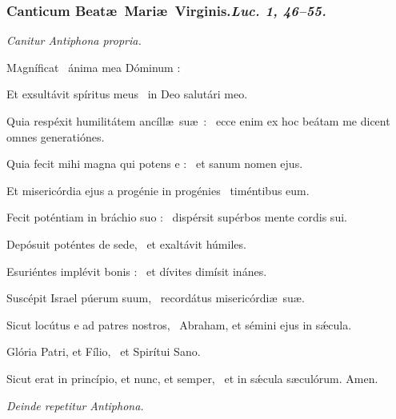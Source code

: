 \documentclass[12pt]{article} %
\newenvironment{psalmtext}{\leftskip 0.25in}{\vspace{2 mm}}
\newenvironment{rubric}{\vspace{2 mm}\color{benred8} \itshape \leftskip 0in \setlength{\parindent}{0.25in}}{\vspace{2 mm}}
\let\oldgresixstar\gresixstar
\renewcommand{\gresixstar}{\textcolor{benred8}{\oldgresixstar}}
\let\oldgrealtcross\grealtcross
\renewcommand{\grealtcross}{\textcolor{benred8}{\oldgrealtcross}}
\def\capitulumSpace{\hspace{20 mm}}
\begin{document}
\begin{pages}
\begin{Leftside}
\subsubsection*{Canticum Beat\ae\ Mari\ae\ Virginis.\capitulumSpace \emph{Luc. 1, 46--55.}}

\pend\pstart

\begin{rubric}
Canitur Antiphona propria.

\end{rubric}

\pend\pstart

\begin{psalmtext}
\lettrine[lhang=0.70]{M}{a}gn\'{i}ficat \grealtcross\ \'{a}nima mea D\'{o}minum :

\hspace*{9.5 mm}Et exsult\'{a}vit sp\'{i}ritus meus \gresixstar\ in Deo salut\'{a}ri meo.

Quia resp\'{e}xit humilit\'{a}tem anc\'{i}ll\ae\ su\ae\ : \gresixstar\ ecce enim ex hoc be\'{a}tam me dicent omnes generati\'{o}nes.

Quia fecit mihi magna qui potens e : \gresixstar\ et sanum nomen ejus.

Et miseric\'{o}rdia ejus a prog\'{e}nie in prog\'{e}nies \gresixstar\ tim\'{e}ntibus eum.

Fecit pot\'{e}ntiam in br\'{a}chio suo : \gresixstar\ disp\'{e}rsit sup\'{e}rbos mente cordis sui.

Dep\'{o}suit pot\'{e}ntes de sede, \gresixstar\ et exalt\'{a}vit h\'{u}miles.

Esuri\'{e}ntes impl\'{e}vit bonis : \gresixstar\ et d\'{i}vites dim\'{i}sit in\'{a}nes.

Susc\'{e}pit Israel p\'{u}erum suum, \gresixstar\ record\'{a}tus miseric\'{o}rdi\ae\ su\ae.

Sicut loc\'{u}tus e ad patres nostros, \gresixstar\ Abraham, et s\'{e}mini ejus in s\'{\ae}cula.

Glória Patri, et Fílio, \gresixstar\ et Spirítui Sano.

Sicut erat in princípio, et nunc, et semper, \gresixstar\ et in sǽcula sæculórum. Amen.

\end{psalmtext}

\pend\pstart

\begin{rubric}
Deinde repetitur Antiphona.


\end{rubric}
\end{Leftside}
\end{pages}
\end{document}
